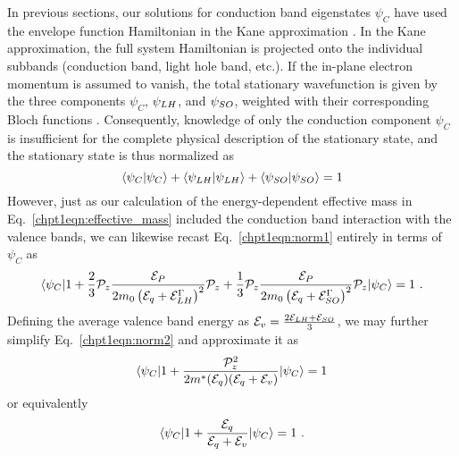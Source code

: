 \documentclass[12pt]{report}
\begin{document}
{In previous sections, our solutions for conduction band eigenstates $\psi_C$ have used the envelope function Hamiltonian in the Kane approximation \cite{Bastard:book:1991}.  In the Kane approximation, the full system Hamiltonian is projected onto the individual subbands (conduction band, light hole band, etc.).  If the in-plane electron momentum is assumed to vanish, the total stationary wavefunction is given by the three components $\psi_C$, $\psi_{\tiny{LH}}$, and $\psi_{\tiny{SO}}$, weighted with their corresponding Bloch functions \cite{Sirtori:PRB:1994}.  Consequently, knowledge of only the conduction component $\psi_C$ is insufficient for the complete physical description of the stationary state, and the stationary state is thus normalized as \cite{Sirtori:PRB:1994}
\begin{equation}
\label{chpt1eqn:norm1}
\langle \psi_C | \psi_C \rangle + \langle \psi_{\tiny{LH}} | \psi_{\tiny{LH}} \rangle + \langle \psi_{\tiny{SO}} | \psi_{\tiny{SO}} \rangle = 1
\end{equation}
However, just as our calculation of the energy-dependent effective mass in Eq.~\eqref{chpt1eqn:effective_mass} included the conduction band interaction with the valence bands, we can likewise recast Eq.~\eqref{chpt1eqn:norm1} entirely in terms of $\psi_C$ as \cite{Sirtori:PRB:1994}
\begin{equation}
\label{chpt1eqn:norm2}
\langle \psi_C | 1+\frac{2}{3}\mathcal{P}_z \frac{\EE_P}{2 m_0 \left(\EE_q+\EE_{{LH}}^\Gamma\right)^2} \mathcal{P}_z +  \frac{1}{3}\mathcal{P}_z \frac{\EE_P}{2 m_0 \left(\EE_q+\EE_{{SO}}^\Gamma\right)^2} \mathcal{P}_z| \psi_C \rangle= 1 {~.}
\end{equation}
Defining the average valence band energy as
$\EE_v = \frac{2 \EE_{LH} + \EE_{SO}}{3}$, we may further simplify Eq.~\eqref{chpt1eqn:norm2} and approximate it as \cite{Leavitt:PRB:1991}
\begin{equation}
\langle \psi_C |1 + \frac{\mathcal{P}_z^2}{2 m^*(\EE_q) (\EE_q+\EE_v)} | \psi_C \rangle = 1
\end{equation}
or equivalently
\begin{equation}
\langle \psi_C |1 +  \frac{\EE_q}{\EE_q+\EE_v} | \psi_C \rangle = 1 {~.}
\end{equation}




}
\end{document}
